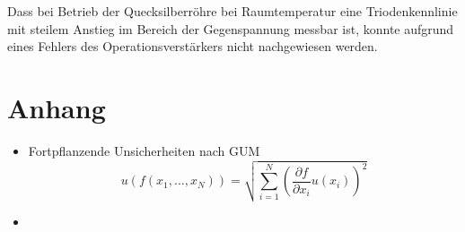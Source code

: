 \documentclass[
	a4paper,
	12pt,
	pagesize,
	ngerman
]{scrartcl}
\begin{document}
	Dass bei Betrieb der Quecksilberröhre bei Raumtemperatur eine Triodenkennlinie mit steilem Anstieg im Bereich der Gegenspannung messbar ist, konnte aufgrund eines Fehlers des Operationsverstärkers nicht nachgewiesen werden.
	
	
	\printbibliography
	
	\section{Anhang}
	\begin{itemize}
	\item Fortpflanzende Unsicherheiten nach GUM
	\begin{equation}
		u(f(x_1,...,x_N)) = \sqrt{\sum_{i=1}^{N}\left(\frac{\partial{f}}{\partial{x_i}}u(x_i)\right)^2}
	\end{equation}
	\item
	 \end{itemize}
\end{document}
